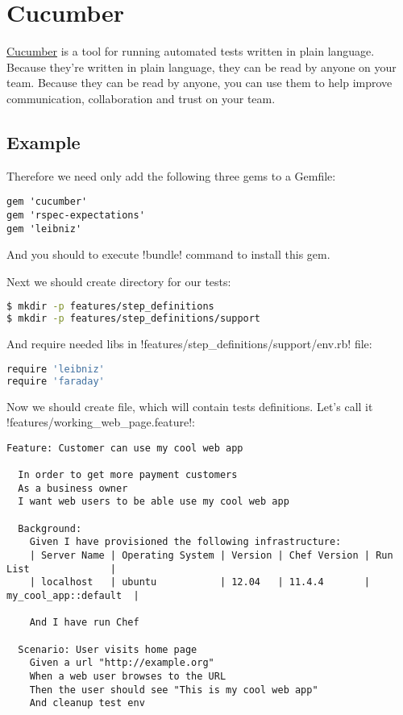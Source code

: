 \section{Cucumber}
\label{sec:testing-cucumber-spec}

\href{http://cukes.info/}{Cucumber} is a tool for running automated tests written in plain language. Because they're written in plain language, they can be read by anyone on your team. Because they can be read by anyone, you can use them to help improve communication, collaboration and trust on your team.

\subsection{Example}

Therefore we need only add the following three gems to a Gemfile:

\begin{lstlisting}[label=lst:testing-cucumber-spec1]
gem 'cucumber'
gem 'rspec-expectations'
gem 'leibniz'
\end{lstlisting}

And you should to execute \inline!bundle! command to install this gem.

Next we should create directory for our tests:

\begin{lstlisting}[language=Bash,label=lst:testing-cucumber-spec2]
$ mkdir -p features/step_definitions
$ mkdir -p features/step_definitions/support
\end{lstlisting}

And require needed libs in \inline!features/step_definitions/support/env.rb! file:

\begin{lstlisting}[language=Bash,label=lst:testing-cucumber-spec3]
require 'leibniz'
require 'faraday'
\end{lstlisting}

Now we should create file, which will contain tests definitions. Let's call it \inline!features/working_web_page.feature!:

\begin{lstlisting}[label=lst:testing-cucumber-spec4]
Feature: Customer can use my cool web app

  In order to get more payment customers
  As a business owner
  I want web users to be able use my cool web app

  Background:
    Given I have provisioned the following infrastructure:
    | Server Name | Operating System | Version | Chef Version | Run List              |
    | localhost   | ubuntu           | 12.04   | 11.4.4       | my_cool_app::default  |

    And I have run Chef

  Scenario: User visits home page
    Given a url "http://example.org"
    When a web user browses to the URL
    Then the user should see "This is my cool web app"
    And cleanup test env
\end{lstlisting}

